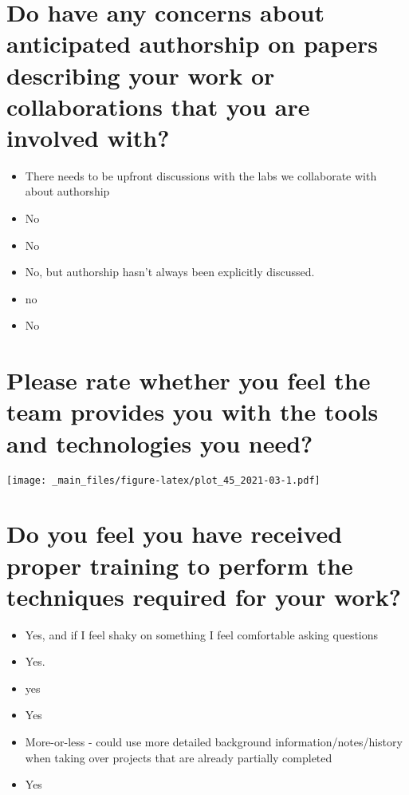 \documentclass[
]{book}
\providecommand{\tightlist}{%
  \setlength{\itemsep}{0pt}\setlength{\parskip}{0pt}}
\begin{document}
\hypertarget{do-have-any-concerns-about-anticipated-authorship-on-papers-describing-your-work-or-collaborations-that-you-are-involved-with-1}{%
\section{Do have any concerns about anticipated authorship on papers describing your work or collaborations that you are involved with?}\label{do-have-any-concerns-about-anticipated-authorship-on-papers-describing-your-work-or-collaborations-that-you-are-involved-with-1}}

\begin{itemize}
\tightlist
\item
  There needs to be upfront discussions with the labs we collaborate with about authorship
\item
  No
\item
  No
\item
  No, but authorship hasn't always been explicitly discussed.
\item
  no
\item
  No
\end{itemize}

\hypertarget{please-rate-whether-you-feel-the-team-provides-you-with-the-tools-and-technologies-you-need-1}{%
\section{Please rate whether you feel the team provides you with the tools and technologies you need?}\label{please-rate-whether-you-feel-the-team-provides-you-with-the-tools-and-technologies-you-need-1}}

\texttt{[image: \_main\_files/figure-latex/plot\_45\_2021-03-1.pdf]}

\hypertarget{do-you-feel-you-have-received-proper-training-to-perform-the-techniques-required-for-your-work-1}{%
\section{Do you feel you have received proper training to perform the techniques required for your work?}\label{do-you-feel-you-have-received-proper-training-to-perform-the-techniques-required-for-your-work-1}}

\begin{itemize}
\tightlist
\item
  Yes, and if I feel shaky on something I feel comfortable asking questions
\item
  Yes.
\item
  yes
\item
  Yes
\item
  More-or-less - could use more detailed background information/notes/history when taking over projects that are already partially completed
\item
  Yes
\end{itemize}
\end{document}
